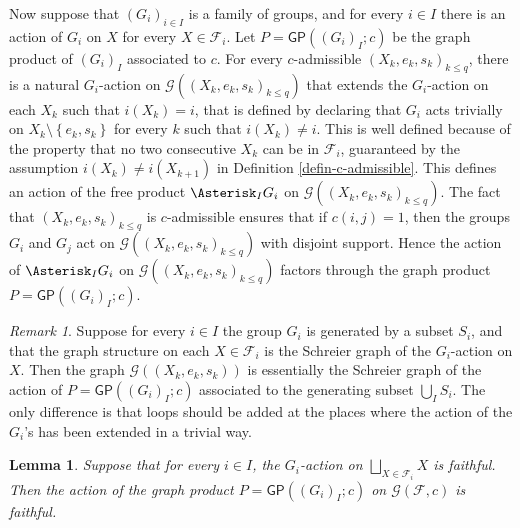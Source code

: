\documentclass[11pt]{amsart}
\newcommand{\F}{\ensuremath{\mathcal{F}}}%
\theoremstyle{definition}
\theoremstyle{plain}
\newtheorem{lem}[defin]{Lemma}
\theoremstyle{remark}
\newtheorem{remark}[defin]{Remark}
\begin{document}

Now suppose that $(G_i)_{i \in I}$ is a family of groups, and for every $i \in I$ there is an action of $G_i$ on $X$ for every $X \in \F_i$. Let $P = \mathsf{GP}((G_i)_{I}; c)$ be the graph product of $(G_i)_I$ associated to $c$. For every $c$-admissible $(X_k,e_k,s_k)_{k \leq q}$, there is a natural $G_i$-action on $\mathcal{G}((X_k,e_k,s_k)_{k \leq q})$ that extends the $G_i$-action on each $X_k$ such that $i(X_k) = i$, that is defined by declaring that $G_i$ acts trivially on $X_{k} \setminus \left\lbrace e_{k},s_k \right\rbrace $ for every $k$ such that $i(X_k) \neq i$. This is well defined because of the property that no two consecutive $X_k$ can be in $\F_i$, guaranteed by the assumption $i(X_k) \neq i(X_{k+1})$ in Definition \ref{defin-c-admissible}. This defines an action of the free product $\Asterisk_I G_i$ on $\mathcal{G}((X_k,e_k,s_k)_{k \leq q})$. The fact that $(X_k,e_k,s_k)_{k \leq q}$ is $c$-admissible ensures that if $c(i,j)=1$, then the groups $G_i$ and $G_j$ act on $\mathcal{G}((X_k,e_k,s_k)_{k \leq q})$ with disjoint support. Hence the action of $\Asterisk_I G_i$ on $\mathcal{G}((X_k,e_k,s_k)_{k \leq q})$ factors through the graph product $P = \mathsf{GP}((G_i)_{I}; c)$.

\begin{remark} \label{rmk-graph-free-prod}
	Suppose for every $i \in I$ the group $G_i$ is generated by a subset $S_i$, and that the graph structure on each $X \in \F_i$ is the Schreier graph of the $G_i$-action on $X$. Then the graph $\mathcal{G}((X_k,e_k,s_k))$  is essentially the Schreier graph of the action of $P = \mathsf{GP}((G_i)_{I}; c)$ associated to the generating subset $\bigcup_I S_i$. The only difference is that loops should be added at the places where the action of the $G_i$'s has been extended in a trivial way.
\end{remark}


\begin{lem} \label{lem-faithful-gluing}
	Suppose that for every $i \in I$, the $G_i$-action on $\bigsqcup_{X \in \F_i} X$ is faithful. Then the action of the graph product $P = \mathsf{GP}((G_i)_{I}; c)$ on $\mathcal{G}(\F,c)$ is faithful. 
\end{lem}
\end{document}

